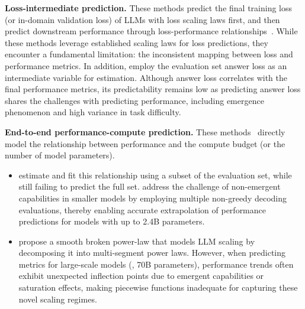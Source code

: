 \noindent\textbf{Loss-intermediate prediction.}
These methods predict the final training loss (or in-domain validation loss) of LLMs with loss scaling laws first, and then predict downstream performance through loss-performance relationships~\citep{chen2024scaling, gadre2024language, du2024understanding, bhagia2024establishing}. While these methods leverage established scaling laws for loss predictions, they encounter a fundamental limitation: the inconsistent mapping between loss and performance metrics. In addition, \citet{xiao2024densing} employ the evaluation set answer loss as an intermediate variable for estimation. Although answer loss correlates with the final performance metrics, its predictability remains low as predicting answer loss shares the challenges with predicting performance, including emergence phenomenon and high variance in task difficulty.


\noindent\textbf{End-to-end performance-compute prediction.}
These methods~\citep{hu2023predicting, owen2024predictable, achiam2023gpt, caballero2022broken} directly model the relationship between performance and the compute budget (or the number of model parameters). 
\begin{itemize}[leftmargin=1.5em]
\item {} \citet{achiam2023gpt} estimate and fit this relationship using a subset of the evaluation set, while still failing to predict the full set. \citet{hu2023predicting} address the challenge of non-emergent capabilities in smaller models by employing multiple non-greedy decoding evaluations, thereby enabling accurate extrapolation of performance predictions for models with up to 2.4B parameters. 

\item {} \citet{caballero2022broken} propose a smooth broken power-law that models LLM scaling by decomposing it into multi-segment power laws. However, when predicting metrics for large-scale models (\eg, 70B parameters), performance trends often exhibit unexpected inflection points due to emergent capabilities or saturation effects, making piecewise functions inadequate for capturing these novel scaling regimes.

\end{itemize}

